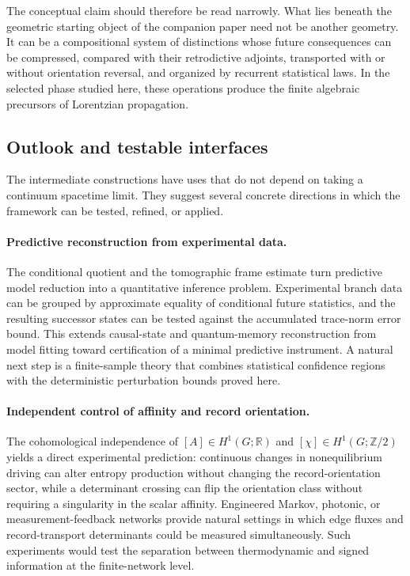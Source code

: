 \documentclass[11pt]{article}
\theoremstyle{definition}
\theoremstyle{remark}
\newcommand{\R}{\mathbb R}
\newcommand{\Ztwo}{\mathbb Z/2}
\begin{document}
The conceptual claim should therefore be read narrowly.  What lies beneath the
geometric starting object of the companion paper need not be another geometry.
It can be a compositional system of distinctions whose future consequences can
be compressed, compared with their retrodictive adjoints, transported with or
without orientation reversal, and organized by recurrent statistical laws.  In
the selected phase studied here, these operations produce the finite algebraic
precursors of Lorentzian propagation.

\subsection{Outlook and testable interfaces}
\label{subsec:outlook}

The intermediate constructions have uses that do not depend on taking a
continuum spacetime limit.  They suggest several concrete directions in which
the framework can be tested, refined, or applied.

\paragraph{Predictive reconstruction from experimental data.}
The conditional quotient and the tomographic frame estimate turn predictive
model reduction into a quantitative inference problem.  Experimental branch
data can be grouped by approximate equality of conditional future statistics,
and the resulting successor states can be tested against the accumulated
trace-norm error bound.  This extends causal-state and quantum-memory
reconstruction \cite{ShaliziCrutchfield2001,GuWiesnerRieperVedral2012,
BinderThompsonGu2018} from model fitting toward certification of a minimal
predictive instrument.  A natural next step is a finite-sample theory that
combines statistical confidence regions with the deterministic perturbation
bounds proved here.

\paragraph{Independent control of affinity and record orientation.}
The cohomological independence of $[A]\in H^1(G;\R)$ and
$[\chi]\in H^1(G;\Ztwo)$ yields a direct experimental prediction: continuous
changes in nonequilibrium driving can alter entropy production without changing
the record-orientation sector, while a determinant crossing can flip the
orientation class without requiring a singularity in the scalar affinity.
Engineered Markov, photonic, or measurement-feedback networks provide natural
settings in which edge fluxes and record-transport determinants could be
measured simultaneously.  Such experiments would test the separation between
thermodynamic and signed information at the finite-network level.
\end{document}
